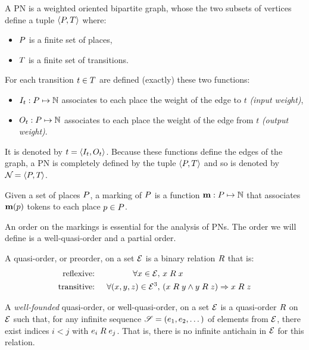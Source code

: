 \begin{defi}[\acl{PN}]
  \label{defi:pn}
  A \acf{PN} \namePN is a weighted oriented bipartite graph, whose the two subsets of vertices define a tuple $\left\langle P, T\right\rangle$ where:
  \begin{itemize}
    \item $P$ is a finite set of places,
    \item $T$ is a finite set of transitions.
  \end{itemize}
  For each transition $t \in T$ are defined (exactly) these two functions:
  \begin{itemize}
    \item $\inw[t] : \places \mapsto \naturals$ associates to each place the weight of the edge to $t$ \emph{(input weight)},
    \item $\outw[t] : \places \mapsto \naturals$ associates to each place the weight of the edge from $t$ \emph{(output weight)}.
  \end{itemize}
  It is denoted by $t = \tuple{\inw[t], \outw[t]}$.
  Because these functions define the edges of the graph, a \ac{PN} is completely defined by the tuple $\left\langle P, T\right\rangle$ and so is denoted by $\mathcal{N}_{} = \left\langle P_{}, T_{}\right\rangle$.
\end{defi}

\begin{defi}[marking]
  Given a set of places $P$, a marking of $P$ is a function $\mathbf{m} : P \mapsto \mathbb{N}$ that associates $\mathbf{m}(p)$ tokens to each place $p \in P$.
\end{defi}

An order on the markings is essential for the analysis of \acp{PN}.
The order we will define is a well-quasi-order and a partial order.

\begin{defi}
  A quasi-order, or preorder, on a set $\mathcal{E}$ is a binary relation $\mathrel{R}$ that is:
  \begin{align*}
    \text{reflexive: }  &&\forall x \in \mathcal{E},\ & x \mathrel{R} x \\
    \text{transitive: } &&\forall (x, y, z) \in \mathcal{E}^3,\ & (x \mathrel{R} y\land y \mathrel{R} z)\Rightarrow x \mathrel{R} z
  \end{align*}
\end{defi}

\begin{defi}
  A \emph{well-founded} quasi-order, or well-quasi-order, on a set $\mathcal{E}$ is a quasi-order $\mathrel{R}$ on $\mathcal{E}$ such that, for any infinite sequence $\defInfSeq$ of elements from $\mathcal{E}$, there exist indices $i < j$ with $e_i \mathrel{R} e_j$. That is, there is no infinite antichain in $\mathcal{E}$ for this relation.
\end{defi}

